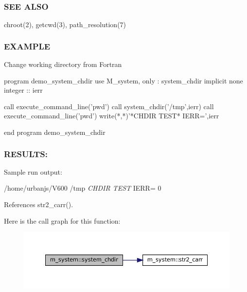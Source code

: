 \subsubsection*{S\+EE A\+L\+SO}

\begin{DoxyVerb}chroot(2), getcwd(3), path_resolution(7)
\end{DoxyVerb}


\subsubsection*{E\+X\+A\+M\+P\+LE}

\begin{DoxyVerb}Change working directory from Fortran

  program demo_system_chdir
  use M_system, only : system_chdir
  implicit none
  integer :: ierr

  call execute_command_line('pwd')
  call system_chdir('/tmp',ierr)
  call execute_command_line('pwd')
  write(*,*)'*CHDIR TEST* IERR=',ierr

  end program demo_system_chdir
\end{DoxyVerb}


\subsubsection*{R\+E\+S\+U\+L\+TS\+:}

Sample run output\+:

/home/urbanjs/\+V600 /tmp {\itshape C\+H\+D\+IR T\+E\+ST} I\+E\+RR= 0 

References str2\+\_\+carr().

Here is the call graph for this function\+:\nopagebreak
\begin{figure}[H]
\begin{center}
\leavevmode
\includegraphics[width=350pt]{namespacem__system_a47746b670cb21bae0957c9bb2bccf209_cgraph}
\end{center}
\end{figure}
\mbox{\label{namespacem__system_ace9ce0c8a9c8341a76b8903cd2390ce3}} 
